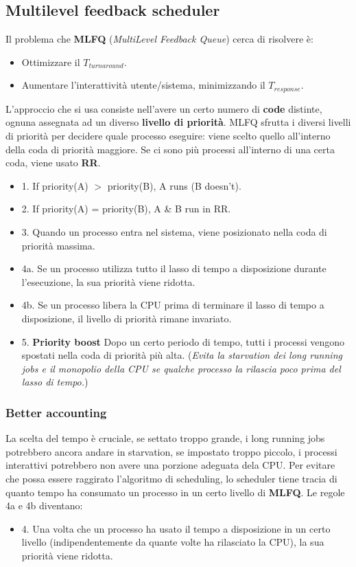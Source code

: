 \documentclass[12pt, letterpaper]{article}
\begin{document}
		\subsection{Multilevel feedback scheduler}
			Il problema che \textbf{MLFQ} (\textit{MultiLevel Feedback Queue}) cerca di risolvere è: 
			\begin{itemize}
				\item Ottimizzare il $T_{turnaround}$.
				\item Aumentare l'interattività utente/sistema, minimizzando il $T_{response}$.
			\end{itemize}
			L'approccio che si usa consiste nell'avere un certo numero di \textbf{code} distinte, ognuna assegnata ad un diverso \textbf{livello di priorità}. MLFQ sfrutta i diversi livelli di priorità per decidere quale processo eseguire: viene scelto quello all'interno della coda di priorità maggiore. Se ci sono più processi all'interno di una certa coda, viene usato \textbf{RR}.
			\begin{itemize}
				\item 1. If priority(A) $>$ priority(B), A runs (B doesn't).
				\item 2. If priority(A) = priority(B), A \& B run in RR.
				\item 3. Quando un processo entra nel sistema, viene posizionato nella coda di priorità massima.
				\item 4a. Se un processo utilizza tutto il lasso di tempo a disposizione durante l'esecuzione, la sua priorità viene ridotta.
				\item 4b. Se un processo libera la CPU prima di terminare il lasso di tempo a disposizione, il livello di priorità rimane invariato.
				\item 5. \textbf{Priority boost }Dopo un certo periodo di tempo, tutti i processi vengono spostati nella coda di priorità più alta. (\textit{Evita la starvation dei long running jobs e il monopolio della CPU se qualche processo la rilascia poco prima del lasso di tempo.})
			\end{itemize}
			
			\subsubsection{Better accounting}
				La  scelta del tempo è cruciale, se settato troppo grande, i long running jobs potrebbero ancora andare in starvation, se impostato troppo piccolo, i processi interattivi potrebbero non avere una porzione adeguata dela CPU. 
				Per evitare che possa essere raggirato l'algoritmo di scheduling, lo scheduler tiene tracia di quanto tempo ha consumato un processo in un certo livello di \textbf{MLFQ}. Le regole 4a e 4b diventano: \\
				\begin{itemize}
					\item 4. Una volta che un processo ha usato il tempo a disposizione in un certo livello (indipendentemente da quante volte ha rilasciato la CPU), la sua priorità viene ridotta.
				\end{itemize}								
\end{document}
